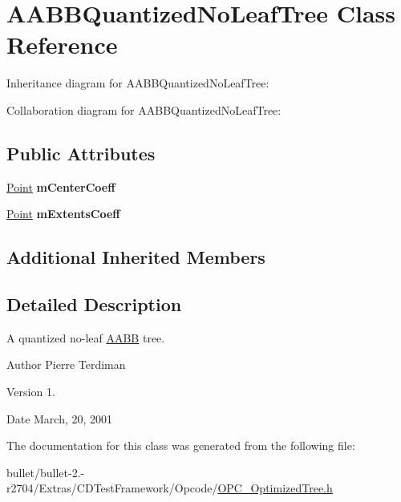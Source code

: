 \hypertarget{class_a_a_b_b_quantized_no_leaf_tree}{\section{A\+A\+B\+B\+Quantized\+No\+Leaf\+Tree Class Reference}
\label{class_a_a_b_b_quantized_no_leaf_tree}
}


Inheritance diagram for A\+A\+B\+B\+Quantized\+No\+Leaf\+Tree\+:


Collaboration diagram for A\+A\+B\+B\+Quantized\+No\+Leaf\+Tree\+:
\subsection*{Public Attributes}
\begin{DoxyCompactItemize}
\item 
\hypertarget{class_a_a_b_b_quantized_no_leaf_tree_aa809fdb1fc8661847b3f4db825d88108}{\hyperlink{class_point}{Point} {\bfseries m\+Center\+Coeff}}\label{class_a_a_b_b_quantized_no_leaf_tree_aa809fdb1fc8661847b3f4db825d88108}

\item 
\hypertarget{class_a_a_b_b_quantized_no_leaf_tree_afc58a1ef3cd7de690b2f00b2a07662c0}{\hyperlink{class_point}{Point} {\bfseries m\+Extents\+Coeff}}\label{class_a_a_b_b_quantized_no_leaf_tree_afc58a1ef3cd7de690b2f00b2a07662c0}

\end{DoxyCompactItemize}
\subsection*{Additional Inherited Members}


\subsection{Detailed Description}
A quantized no-\/leaf \hyperlink{class_a_a_b_b}{A\+A\+B\+B} tree.

\begin{DoxyAuthor}{Author}
Pierre Terdiman 
\end{DoxyAuthor}
\begin{DoxyVersion}{Version}
1. 
\end{DoxyVersion}
\begin{DoxyDate}{Date}
March, 20, 2001 
\end{DoxyDate}


The documentation for this class was generated from the following file\+:\begin{DoxyCompactItemize}
\item 
bullet/bullet-\/2.-\/r2704/\+Extras/\+C\+D\+Test\+Framework/\+Opcode/\hyperlink{_o_p_c___optimized_tree_8h}{O\+P\+C\+\_\+\+Optimized\+Tree.\+h}\end{DoxyCompactItemize}
